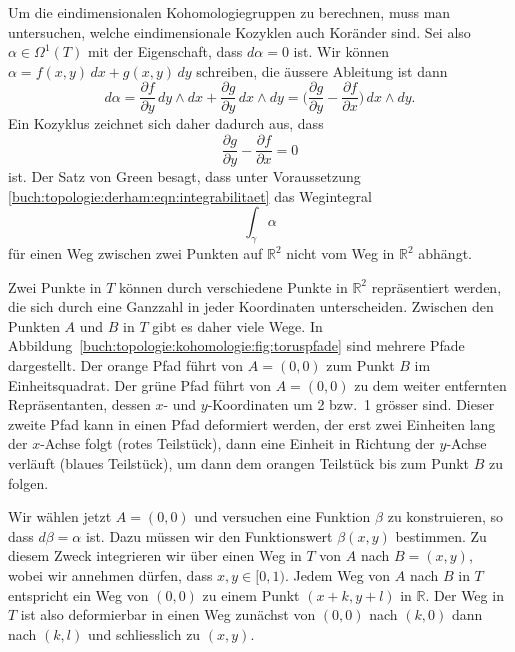 Um die eindimensionalen Kohomologiegruppen zu berechnen, muss man
untersuchen, welche eindimensionale Kozyklen auch Koränder sind.
Sei also $\alpha\in \Omega^1(T)$ mit der Eigenschaft, dass $d\alpha=0$
ist.
Wir können $\alpha = f(x,y)\,dx + g(x,y)\,dy$ schreiben, die äussere Ableitung
ist dann
\[
d\alpha
=
\frac{\partial f}{\partial y}\,dy\wedge dx
+
\frac{\partial g}{\partial y}\,dx\wedge dy
=
\biggl(\frac{\partial g}{\partial y}-\frac{\partial f}{\partial x}\biggr)
\,dx\wedge dy.
\]
Ein Kozyklus zeichnet sich daher dadurch aus, dass
\begin{equation}
\frac{\partial g}{\partial y}-\frac{\partial f}{\partial x}
=
0
\label{buch:topologie:derham:eqn:integrabilitaet}
\end{equation}
ist.
Der Satz von Green besagt, dass unter Voraussetzung
\eqref{buch:topologie:derham:eqn:integrabilitaet}
das Wegintegral
\[
\int_\gamma \alpha
\]
für einen Weg zwischen zwei Punkten auf $\mathbb{R}^2$ nicht vom Weg
in $\mathbb{R}^2$ abhängt.

Zwei Punkte in $T$ können durch verschiedene Punkte in
$\mathbb{R}^2$ repräsentiert werden, die sich durch eine Ganzzahl
in jeder Koordinaten unterscheiden.
Zwischen den Punkten $A$ und $B$ in $T$ gibt es daher viele Wege.
In Abbildung~\ref{buch:topologie:kohomologie:fig:toruspfade} sind
mehrere Pfade dargestellt.
Der orange Pfad führt von $A=(0,0)$ zum Punkt $B$ im Einheitsquadrat.
Der grüne Pfad führt von $A=(0,0)$ zu dem weiter entfernten
Repräsentanten, dessen $x$- und $y$-Koordinaten um 2 bzw.~1 grösser
sind.
Dieser zweite Pfad kann in einen Pfad deformiert werden, der erst
zwei Einheiten lang der $x$-Achse folgt ({\color{darkred}rotes}
Teilstück), dann eine Einheit in Richtung der $y$-Achse verläuft
({\color{blue}blaues} Teilstück), um dann dem {\color{orange}orangen}
Teilstück bis zum Punkt $B$ zu folgen.

Wir wählen jetzt $A=(0,0)$ und versuchen eine Funktion $\beta$ zu
konstruieren, so dass $d\beta =\alpha$ ist.
Dazu müssen wir den Funktionswert $\beta(x,y)$ bestimmen.
Zu diesem Zweck integrieren wir über einen Weg in $T$ von $A$ nach
$B=(x,y)$, wobei wir annehmen dürfen, dass $x,y\in[0,1)$.
Jedem Weg von $A$ nach $B$ in $T$ entspricht ein Weg von $(0,0)$
zu einem Punkt $(x+k,y+l)$ in $\mathbb{R}$.
Der Weg in $T$ ist also deformierbar in einen Weg
zunächst von $(0,0)$ nach $(k,0)$ dann nach $(k,l)$ und schliesslich
zu $(x,y)$.

